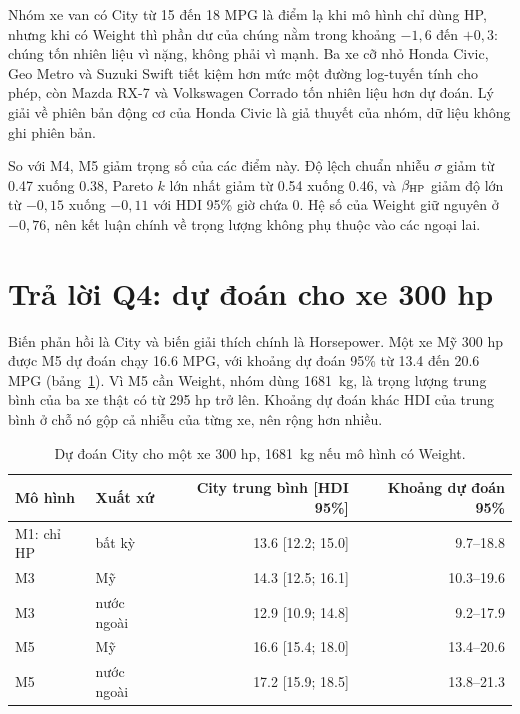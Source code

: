 \documentclass[12pt,a4paper]{report}
\begin{document}
Nhóm xe van có City từ 15 đến 18 MPG là điểm lạ khi mô hình chỉ dùng HP, nhưng
khi có Weight thì phần dư của chúng nằm trong khoảng $-1{,}6$ đến $+0{,}3$: chúng
tốn nhiên liệu vì nặng, không phải vì mạnh. Ba xe cỡ nhỏ Honda Civic, Geo Metro
và Suzuki Swift tiết kiệm hơn mức một đường log-tuyến tính cho phép, còn Mazda
RX-7 và Volkswagen Corrado tốn nhiên liệu hơn dự đoán. Lý giải về phiên bản động
cơ của Honda Civic là giả thuyết của nhóm, dữ liệu không ghi phiên bản.

So với M4, M5 giảm trọng số của các điểm này. Độ lệch chuẩn nhiễu $\sigma$ giảm
từ \num{0.47} xuống \num{0.38}, Pareto $k$ lớn nhất giảm từ \num{0.54} xuống
\num{0.46}, và $\beta_{\mathrm{HP}}$ giảm độ lớn từ $-0{,}15$ xuống $-0{,}11$ với HDI 95\%
giờ chứa 0. Hệ số của Weight giữ nguyên ở $-0{,}76$, nên kết luận chính về
trọng lượng không phụ thuộc vào các ngoại lai.


\section{Trả lời Q4: dự đoán cho xe 300 hp}
\label{sec:q4}

Biến phản hồi là City và biến giải thích chính là Horsepower. Một xe Mỹ 300 hp
được M5 dự đoán chạy \num{16.6} MPG, với khoảng dự đoán 95\% từ \num{13.4} đến
\num{20.6} MPG (bảng~\ref{tab:q4}). Vì M5 cần Weight, nhóm dùng \SI{1681}{kg},
là trọng lượng trung bình của ba xe thật có từ 295 hp trở lên. Khoảng dự đoán
khác HDI của trung bình ở chỗ nó gộp cả nhiễu của từng xe, nên rộng hơn nhiều.

\begin{table}[tp]
  \centering
  \caption{Dự đoán City cho một xe 300 hp, \SI{1681}{kg} nếu mô hình có Weight.}
  \label{tab:q4}
  \begin{tabular}{llrr}
    \toprule
    Mô hình & Xuất xứ & City trung bình [HDI 95\%] & Khoảng dự đoán 95\% \\
    \midrule
    M1: chỉ HP & bất kỳ      & \num{13.6} [\num{12.2}; \num{15.0}] & \num{9.7}--\num{18.8} \\
    M3         & Mỹ          & \num{14.3} [\num{12.5}; \num{16.1}] & \num{10.3}--\num{19.6} \\
    M3         & nước ngoài  & \num{12.9} [\num{10.9}; \num{14.8}] & \num{9.2}--\num{17.9} \\
    M5         & Mỹ          & \num{16.6} [\num{15.4}; \num{18.0}] & \num{13.4}--\num{20.6} \\
    M5         & nước ngoài  & \num{17.2} [\num{15.9}; \num{18.5}] & \num{13.8}--\num{21.3} \\
    \bottomrule
  \end{tabular}
\end{table}
\end{document}
